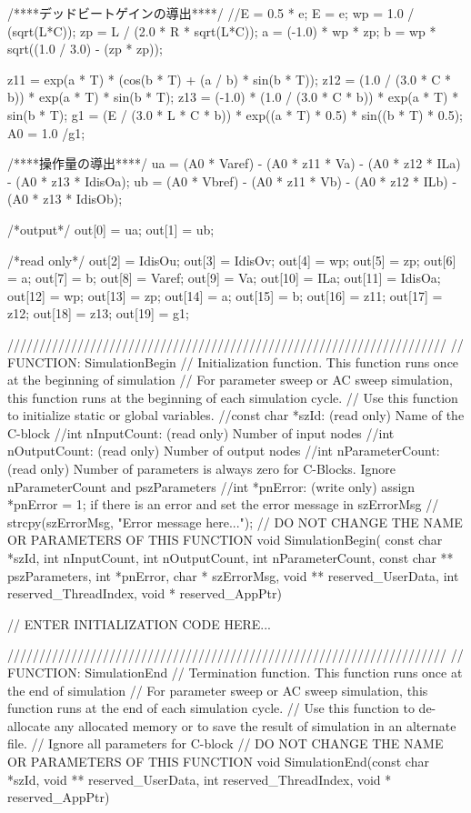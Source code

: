 \begin{mylisting}[language=c,caption=SRDCDB制御モジュール,label=hurokuB_SRDBcontrol]
{/****デッドビートゲインの導出****/
//E = 0.5 * e;
E = e;
wp = 1.0 / (sqrt(L*C));
zp = L / (2.0 * R * sqrt(L*C));
a = (-1.0) * wp * zp;
b = wp * sqrt((1.0 / 3.0) - (zp * zp));

z11 = exp(a * T) * (cos(b * T) + (a / b) * sin(b * T));
z12 = (1.0 / (3.0 * C * b)) * exp(a * T) * sin(b * T);
z13 = (-1.0) * (1.0 / (3.0 * C * b)) * exp(a * T) * sin(b * T);
g1 = (E / (3.0 * L * C * b)) * exp((a * T) * 0.5) * sin((b * T) * 0.5);
A0  = 1.0 /g1;


/****操作量の導出****/
ua = (A0 * Varef) - (A0 * z11 * Va) - (A0 * z12 * ILa) - (A0 * z13 * IdisOa);
ub = (A0 * Vbref) - (A0 * z11 * Vb) - (A0 * z12 * ILb) - (A0 * z13 * IdisOb);


/*output*/
out[0] = ua;
out[1] = ub;

/*read only*/
out[2] = IdisOu;
out[3] = IdisOv;
out[4] = wp;
out[5] = zp;
out[6] = a;
out[7] = b;
out[8] = Varef;
out[9] = Va;
out[10] = ILa;
out[11] = IdisOa;
out[12] = wp;
out[13] = zp;
out[14] = a;
out[15] = b;
out[16] = z11;
out[17] = z12;
out[18] = z13;
out[19] = g1;

}


/////////////////////////////////////////////////////////////////////
// FUNCTION: SimulationBegin
//   Initialization function. This function runs once at the beginning of simulation
//   For parameter sweep or AC sweep simulation, this function runs at the beginning of each simulation cycle.
//   Use this function to initialize static or global variables.
//const char *szId: (read only) Name of the C-block 
//int nInputCount: (read only) Number of input nodes
//int nOutputCount: (read only) Number of output nodes
//int nParameterCount: (read only) Number of parameters is always zero for C-Blocks.  Ignore nParameterCount and pszParameters
//int *pnError: (write only)  assign  *pnError = 1;  if there is an error and set the error message in szErrorMsg
//    strcpy(szErrorMsg, "Error message here..."); 
// DO NOT CHANGE THE NAME OR PARAMETERS OF THIS FUNCTION
void SimulationBegin(
		const char *szId, int nInputCount, int nOutputCount,
		 int nParameterCount, const char ** pszParameters,
		 int *pnError, char * szErrorMsg,
		 void ** reserved_UserData, int reserved_ThreadIndex, void * reserved_AppPtr)
{
// ENTER INITIALIZATION CODE HERE...




}


/////////////////////////////////////////////////////////////////////
// FUNCTION: SimulationEnd
//   Termination function. This function runs once at the end of simulation
//   For parameter sweep or AC sweep simulation, this function runs at the end of each simulation cycle.
//   Use this function to de-allocate any allocated memory or to save the result of simulation in an alternate file.
// Ignore all parameters for C-block 
// DO NOT CHANGE THE NAME OR PARAMETERS OF THIS FUNCTION
void SimulationEnd(const char *szId, void ** reserved_UserData, int reserved_ThreadIndex, void * reserved_AppPtr)
{




}
\end{mylisting}
